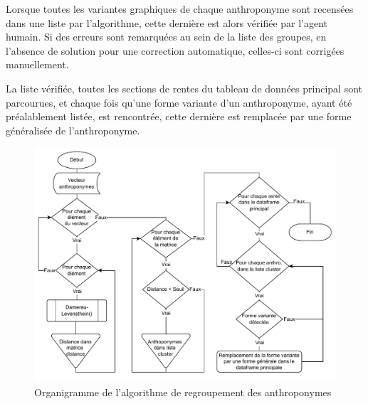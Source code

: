 Lorsque toutes les variantes graphiques de chaque anthroponyme sont recensées dans une liste par l'algorithme, cette dernière est alors vérifiée par l'agent humain. Si des erreurs sont remarquées au sein de la liste des groupes, en l'absence de solution pour une correction automatique, celles-ci sont corrigées manuellement.

La liste vérifiée, toutes les sections de rentes du tableau de données principal sont parcourues, et chaque fois qu'une forme variante d'un anthroponyme, ayant été préalablement listée, est rencontrée, cette dernière est remplacée par une forme généralisée de l'anthroponyme. 

\begin{figure} %
    \centering
    \includegraphics[scale=0.75]{2.Methods/Img/clustering.drawio.pdf} 
    \caption{Organigramme de l'algorithme de regroupement des anthroponymes}
    \label{schemaClustering}
\end{figure}


